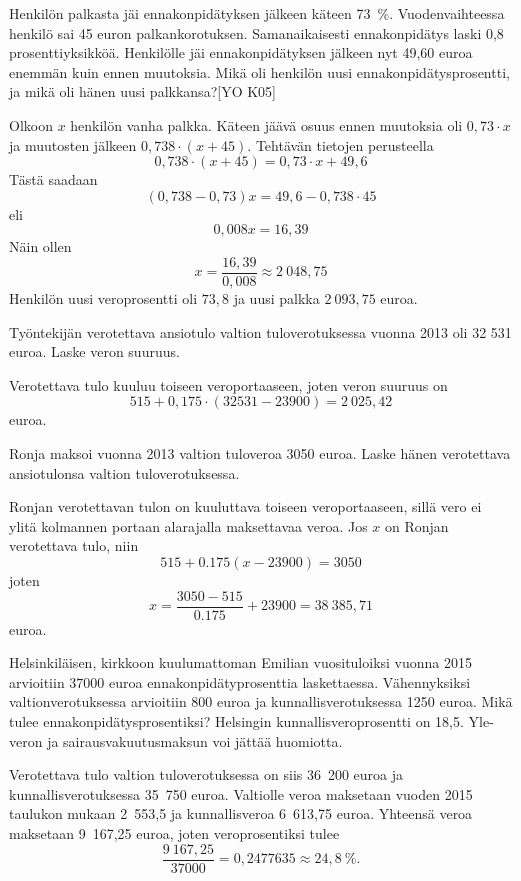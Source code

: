 \documentclass[a4paper,10pt]{article}\usepackage[]{graphicx}\usepackage[]{color}
\begin{document}
\begin{question} Henkilön palkasta jäi ennakonpidätyksen jälkeen käteen 73~\%. Vuodenvaihteessa henkilö sai 45 euron palkankorotuksen. Samanaikaisesti ennakonpidätys laski 0,8 prosenttiyksikköä. Henkilölle jäi ennakonpidätyksen jälkeen nyt 49,60 euroa enemmän kuin ennen muutoksia.
Mikä oli henkilön uusi ennakonpidätysprosentti, ja mikä oli hänen uusi palkkansa?[YO K05]
\end{question}
\begin{solution}

Olkoon \(x\) henkilön vanha palkka. Käteen jäävä osuus ennen muutoksia oli \(0{,}73\cdot x\) ja muutosten jälkeen \(0{,}738\cdot (x + 45)\). Tehtävän tietojen perusteella
\[
	0{,}738\cdot(x+45) = 0{,}73\cdot x + 49{,}6
\]
Tästä saadaan
\[
	(0{,}738 - 0{,}73)x = 49{,}6-0{,}738\cdot45
\]
eli
\[
	0{,}008x = 16{,}39
\]
Näin ollen 
\[
	x = \frac{16{,}39}{0{,}008} \approx 2~048{,}75
\]
Henkilön uusi veroprosentti oli \(73{,}8\) ja uusi palkka \(2~093{,}75\) euroa.
\end{solution}

\begin{question} Työntekijän verotettava ansiotulo valtion tuloverotuksessa vuonna 2013 oli 32 531 euroa. Laske veron suuruus.
\end{question}
\begin{solution}

Verotettava tulo kuuluu toiseen veroportaaseen, joten veron suuruus on 
\[
	515 + 0,175\cdot(32531-23900) = 2~025{,}42
\]
euroa.
\end{solution}

\begin{question} Ronja maksoi vuonna 2013 valtion tuloveroa 3050 euroa. Laske hänen verotettava ansiotulonsa valtion tuloverotuksessa.
\end{question}
\begin{solution}
	Ronjan verotettavan tulon on kuuluttava toiseen veroportaaseen, sillä vero ei ylitä kolmannen portaan alarajalla maksettavaa veroa. Jos \(x\) on Ronjan verotettava tulo, niin
\[
	515 + 0.175(x - 23900) = 3050
\]
joten 
\[
	x = \frac{3050 - 515}{0.175} + 23900 = 38~385{,}71
\]
euroa.
\end{solution}

\begin{question} Helsinkiläisen, kirkkoon kuulumattoman Emilian vuosituloiksi vuonna 2015 arvioitiin \(37 000\) euroa ennakonpidätyprosenttia laskettaessa. Vähennyksiksi valtionverotuksessa arvioitiin 800 euroa ja kunnallisverotuksessa 1250 euroa. Mikä tulee ennakonpidätysprosentiksi? Helsingin kunnallisveroprosentti on 18,5. Yle-veron ja sairausvakuutusmaksun voi jättää huomiotta.
\end{question}
\begin{solution}
	Verotettava tulo valtion tuloverotuksessa on siis 36~200 euroa ja kunnallisverotuksessa 35~750 euroa. Valtiolle veroa maksetaan vuoden 2015 taulukon mukaan 2~553{,}5 ja kunnallisveroa 6~613{,}75 euroa. Yhteensä veroa maksetaan 9~167{,}25 euroa, joten veroprosentiksi tulee
\[
	\frac{9~167{,}25}{37000} = 0{,}2477635\approx 24{,}8~\%.
\]
\end{solution}
\end{document}
